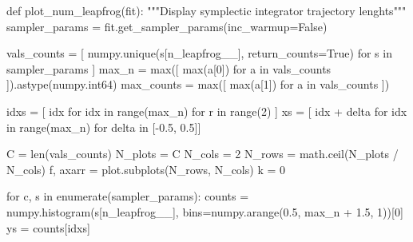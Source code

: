 \documentclass[
  letterpaper,
  DIV=11,
  numbers=noendperiod]{scrartcl}
\newenvironment{Shaded}{\begin{snugshade}}{\end{snugshade}}
\newcommand{\BuiltInTok}[1]{\textcolor[rgb]{0.00,0.23,0.31}{#1}}
\newcommand{\CommentTok}[1]{\textcolor[rgb]{0.37,0.37,0.37}{#1}}
\newcommand{\ControlFlowTok}[1]{\textcolor[rgb]{0.00,0.23,0.31}{#1}}
\newcommand{\DecValTok}[1]{\textcolor[rgb]{0.68,0.00,0.00}{#1}}
\newcommand{\FloatTok}[1]{\textcolor[rgb]{0.68,0.00,0.00}{#1}}
\newcommand{\KeywordTok}[1]{\textcolor[rgb]{0.00,0.23,0.31}{#1}}
\newcommand{\NormalTok}[1]{\textcolor[rgb]{0.00,0.23,0.31}{#1}}
\newcommand{\OperatorTok}[1]{\textcolor[rgb]{0.37,0.37,0.37}{#1}}
\newcommand{\StringTok}[1]{\textcolor[rgb]{0.13,0.47,0.30}{#1}}
\newcommand{\VariableTok}[1]{\textcolor[rgb]{0.07,0.07,0.07}{#1}}
\begin{document}
\begin{Shaded}
\begin{Highlighting}[]
\KeywordTok{def}\NormalTok{ plot\_num\_leapfrog(fit):}
  \CommentTok{"""Display symplectic integrator trajectory lenghts"""}
\NormalTok{  sampler\_params }\OperatorTok{=}\NormalTok{ fit.get\_sampler\_params(inc\_warmup}\OperatorTok{=}\VariableTok{False}\NormalTok{)}
  
\NormalTok{  vals\_counts }\OperatorTok{=}\NormalTok{ [ numpy.unique(s[}\StringTok{\textquotesingle{}n\_leapfrog\_\_\textquotesingle{}}\NormalTok{], return\_counts}\OperatorTok{=}\VariableTok{True}\NormalTok{) }
                  \ControlFlowTok{for}\NormalTok{ s }\KeywordTok{in}\NormalTok{ sampler\_params ] }
\NormalTok{  max\_n }\OperatorTok{=} \BuiltInTok{max}\NormalTok{([ }\BuiltInTok{max}\NormalTok{(a[}\DecValTok{0}\NormalTok{]) }\ControlFlowTok{for}\NormalTok{ a }\KeywordTok{in}\NormalTok{ vals\_counts ]).astype(numpy.int64)}
\NormalTok{  max\_counts }\OperatorTok{=} \BuiltInTok{max}\NormalTok{([ }\BuiltInTok{max}\NormalTok{(a[}\DecValTok{1}\NormalTok{]) }\ControlFlowTok{for}\NormalTok{ a }\KeywordTok{in}\NormalTok{ vals\_counts ])}
  
\NormalTok{  idxs }\OperatorTok{=}\NormalTok{ [ idx }\ControlFlowTok{for}\NormalTok{ idx }\KeywordTok{in} \BuiltInTok{range}\NormalTok{(max\_n) }\ControlFlowTok{for}\NormalTok{ r }\KeywordTok{in} \BuiltInTok{range}\NormalTok{(}\DecValTok{2}\NormalTok{) ]}
\NormalTok{  xs }\OperatorTok{=}\NormalTok{ [ idx }\OperatorTok{+}\NormalTok{ delta }\ControlFlowTok{for}\NormalTok{ idx }\KeywordTok{in} \BuiltInTok{range}\NormalTok{(max\_n) }\ControlFlowTok{for}\NormalTok{ delta }\KeywordTok{in}\NormalTok{ [}\OperatorTok{{-}}\FloatTok{0.5}\NormalTok{, }\FloatTok{0.5}\NormalTok{]]}
  
\NormalTok{  C }\OperatorTok{=} \BuiltInTok{len}\NormalTok{(vals\_counts)}
\NormalTok{  N\_plots }\OperatorTok{=}\NormalTok{ C}
\NormalTok{  N\_cols }\OperatorTok{=} \DecValTok{2}
\NormalTok{  N\_rows }\OperatorTok{=}\NormalTok{ math.ceil(N\_plots }\OperatorTok{/}\NormalTok{ N\_cols)}
\NormalTok{  f, axarr }\OperatorTok{=}\NormalTok{ plot.subplots(N\_rows, N\_cols)}
\NormalTok{  k }\OperatorTok{=} \DecValTok{0}
  
  \ControlFlowTok{for}\NormalTok{ c, s }\KeywordTok{in} \BuiltInTok{enumerate}\NormalTok{(sampler\_params):}
\NormalTok{    counts }\OperatorTok{=}\NormalTok{ numpy.histogram(s[}\StringTok{\textquotesingle{}n\_leapfrog\_\_\textquotesingle{}}\NormalTok{], }
\NormalTok{                             bins}\OperatorTok{=}\NormalTok{numpy.arange(}\FloatTok{0.5}\NormalTok{, max\_n }\OperatorTok{+} \FloatTok{1.5}\NormalTok{, }\DecValTok{1}\NormalTok{))[}\DecValTok{0}\NormalTok{]}
\NormalTok{    ys }\OperatorTok{=}\NormalTok{ counts[idxs]}


\end{Highlighting}
\end{Shaded}
\end{document}
